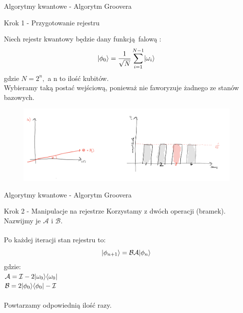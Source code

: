 \documentclass{beamer}
\DeclarePairedDelimiter\bra{\langle}{\rvert}
\DeclarePairedDelimiter\ket{\lvert}{\rangle}
\begin{document}
	\begin{frame}{Algorytmy kwantowe - Algorytm Groovera}
		\begin{block}{Krok 1 - Przygotowanie rejestru}

			Niech rejestr kwantowy będzie dany funkcją falową : 
			$$\ket{\phi_{0}} = \frac{1}{\sqrt{N}}\sum\limits_{i=1}^{N-1}\ket{\omega_{i}} $$
			gdzie $N = 2^{n},$ a n to ilość kubitów.\\ \vspace{0.4em}
			Wybieramy taką postać wejściową, ponieważ nie faworyzuje żadnego ze stanów bazowych. 
		\end{block}
		\begin{center}
			\begin{figure}
				\includegraphics[scale=0.5]{media/groverINIT.png}
			\end{figure}
		\end{center}
	\end{frame}
	
	
	
	\begin{frame}{Algorytmy kwantowe - Algorytm Groovera}
		\begin{block}{Krok 2 - Manipulacje na rejestrze}
			\vspace{0.5em}
			Korzystamy z dwóch operacji (bramek). Nazwijmy je $\mathcal{A}$ i $\mathcal{B}$.\\~\\
			Po każdej iteracji stan rejestru to:
			$$\ket{\phi_{n+1}} =\mathcal{B}\mathcal{A}\ket{\phi_{n}}$$
			\quad gdzie:\\
			\centering
			$\mathcal{A} = \mathcal{I} - 2\ket{\omega_{0}}\bra{\omega_{0}}$\vspace{0.5em}\\
			$\mathcal{B} = 2\ket{\phi_{0}}\bra{\phi_{0}} - \mathcal{I} $\\~\\
			Powtarzamy odpowiednią ilość razy.
			
			\vspace{0.5em}
		\end{block}
	\end{frame}
	
\end{document}

